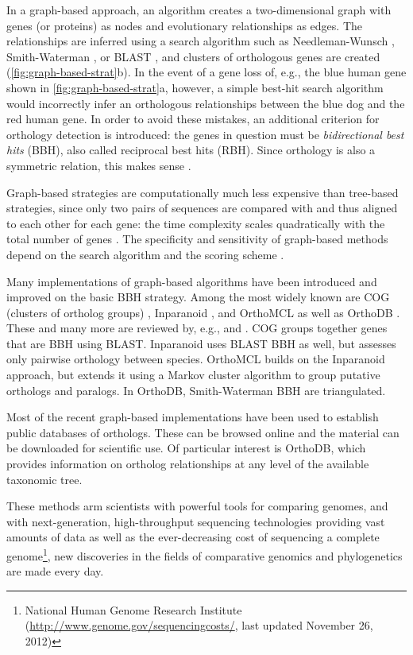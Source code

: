 In a graph-based approach, an algorithm creates a two-dimensional graph with
genes (or proteins) as nodes and evolutionary relationships as edges. The
relationships are inferred using a search algorithm such as Needleman-Wunsch
\citeyearpar{needleman1970}, Smith-Waterman \citeyearpar{smith1981}, or BLAST
\citep{altschul1990}, and clusters of orthologous genes are created
(\autoref{fig:graph-based-strat}b). In the event of a gene loss of, e.g., the
blue human gene shown in \autoref{fig:graph-based-strat}a, however, a simple
best-hit search algorithm would incorrectly infer an orthologous relationships
between the blue dog and the red human gene. In order to avoid these mistakes,
an additional criterion for orthology detection is introduced: the genes in
question must be \emph{bidirectional best hits} (BBH), also called reciprocal
best hits (RBH).  Since orthology is also a symmetric relation, this makes sense
.



Graph-based strategies are computationally much less expensive than tree-based
strategies, since only two pairs of sequences are compared with and thus aligned
to each other for each gene: the time complexity scales quadratically with the
total number of genes \citep{altenhoff2012-1}. The specificity and sensitivity
of graph-based methods depend on the search algorithm and the scoring scheme
\citep{hulsen2006}.

Many implementations of graph-based algorithms have been introduced and improved
on the basic BBH strategy. Among the most widely known are COG (clusters of
ortholog groups) \citep{tatusov2003}, Inparanoid \citep{ostlund2010}, and
OrthoMCL \citep{li2003} as well as OrthoDB \citep{waterhouse2011}. These and
many more are reviewed by, e.g., \citet{kuzniar2008} and \citet{forslund2011}.
COG groups together genes that are BBH using BLAST. Inparanoid uses BLAST BBH as
well, but assesses only pairwise orthology between species. OrthoMCL builds on
the Inparanoid approach, but extends it using a Markov cluster algorithm to
group putative orthologs and paralogs. In OrthoDB, Smith-Waterman BBH are
triangulated.

Most of the recent graph-based implementations have been used to establish
public databases of orthologs. These can be browsed online and the material can
be downloaded for scientific use. Of particular interest is OrthoDB, which
provides information on ortholog relationships at any level of the available
taxonomic tree. 

These methods arm scientists with powerful tools for comparing genomes, and with
next-generation, high-throughput sequencing technologies providing vast amounts
of data as well as the ever-decreasing cost of sequencing a complete
genome\footnote{National Human Genome Research Institute
(\url{http://www.genome.gov/sequencingcosts/}, last updated November 26, 2012)},
new discoveries in the fields of comparative genomics and phylogenetics are made
every day. 

